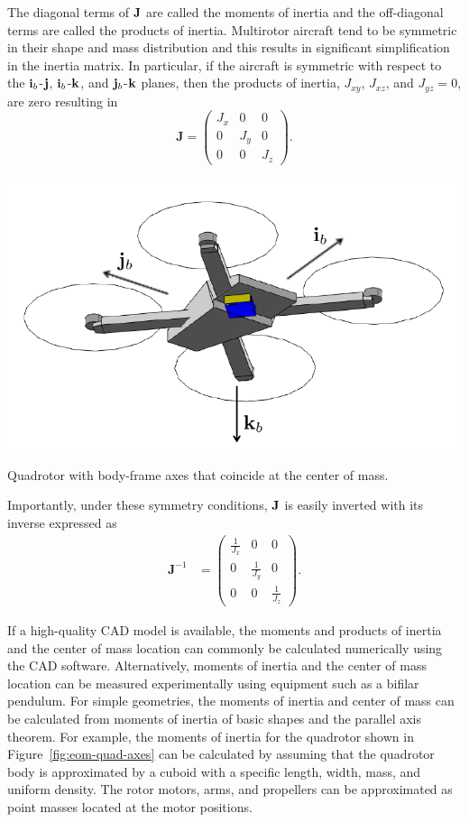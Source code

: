 The diagonal terms of $\mathbf{J}$ are called the moments of inertia and the off-diagonal terms are called the products of inertia. Multirotor aircraft tend to be symmetric in their shape and mass distribution and this results in significant simplification in the inertia matrix. In particular, if the aircraft is symmetric with respect to the $\mathbf{i}_b$-$\mathbf{j}$, $\mathbf{i}_b$-$\mathbf{k}$, and $\mathbf{j}_b$-$\mathbf{k}$ planes, then the products of inertia, $J_{xy}$, $J_{xz}$, and $J_{yz}=0$, are zero resulting in
\[
\mathbf{J} =
    \begin{pmatrix}
    J_{x}   & 0       & 0 \\
    0       & J_{y}   & 0 \\
    0 & 0       & J_{z}
    \end{pmatrix}.
\]
%
\begin{marginfigure}
	\includegraphics{chap3_multirotor/figures/eom-quad-axes}
	\caption{Quadrotor with body-frame axes that coincide at the center of mass.}
	\label{fig:eom-quad-axes}
\end{marginfigure}
%
Importantly, under these symmetry conditions, $\mathbf{J}$ is easily inverted with its inverse expressed as
\begin{align*}
\mathbf{J}^{-1}
    &= \begin{pmatrix}
        \frac{1}{J_x} & 0 & 0 \\
        0 & \frac{1}{J_y} & 0 \\
        0 & 0 & \frac{1}{J_z}
       \end{pmatrix} .
\end{align*}

If a high-quality CAD model is available, the moments and products of inertia and the center of mass location can commonly be calculated numerically using the CAD software. Alternatively, moments of inertia and the center of mass location can be measured experimentally using equipment such as a bifilar pendulum. For simple geometries, the moments of inertia and center of mass can be calculated from moments of inertia of basic shapes and the parallel axis theorem. For example, the moments of inertia for the quadrotor shown in Figure~\ref{fig:eom-quad-axes} can be calculated by assuming that the quadrotor body is approximated by a cuboid with a specific length, width, mass, and uniform density. The rotor motors, arms, and propellers can be approximated as point masses located at the motor positions.

